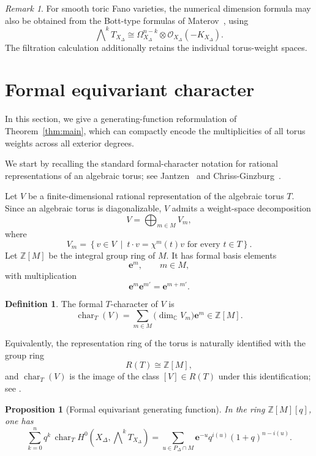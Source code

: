 \documentclass[colorlinks,11pt,reqno]{amsart}
\newtheorem{proposition}[theorem]{Proposition}
\theoremstyle{definition}
\newtheorem{definition}[theorem]{Definition}
\theoremstyle{remark}
\newtheorem{remark}[theorem]{Remark}
\numberwithin{equation}{section}
\numberwithin{equation}{section}
\newcommand{\C}{\mathbb{C}}
\newcommand{\Z}{\mathbb{Z}}
\DeclareMathOperator{\charac}{char}
\begin{document}
\begin{remark}
For smooth toric Fano varieties, the numerical dimension formula may also be obtained from the Bott-type formulas of Materov~\cite{Materov 02}, using
\[
\bigwedge\nolimits^kT_{X_\Delta} \cong
\Omega_{X_\Delta}^{n-k} \otimes \mathcal{O}_{X_\Delta}(-K_{X_\Delta}).
\]
The filtration calculation additionally retains the individual torus-weight spaces.
\end{remark}

\section{Formal equivariant character}\label{subsec:formal-character}
In this section, we give a generating-function reformulation of Theorem~\ref{thm:main}, which can compactly encode the multiplicities of all torus weights across all exterior degrees.

We start by recalling the standard formal-character notation for rational representations of an algebraic torus; see Jantzen~\cite{Jantzen} and Chriss-Ginzburg~\cite{ChrissGinzburg}.

Let \(V\) be a finite-dimensional rational representation of the algebraic torus \(T\).
Since an algebraic torus is diagonalizable, \(V\) admits a weight-space decomposition
\[
V=\bigoplus_{m\in M}V_m,
\]
where
\[
V_m =
\left\{
v\in V\ \middle|\
t\cdot v=\chi^m(t)v
\text{ for every }t\in T
\right\}.
\]
Let \(\Z[M]\) be the integral group ring of \(M\). It has formal basis elements
\[
\mathbf e^m,\qquad m\in M,
\]
with multiplication
\[
\mathbf e^m\mathbf e^{m'} = \mathbf e^{m+m'}.
\]

\begin{definition}\label{def:formal-character}
The formal \(T\)-character of \(V\) is
\[
\charac_T(V) = \sum_{m\in M} \bigl(\dim_{\C}V_m\bigr)\mathbf e^m \in \Z[M].
\]
\end{definition}

Equivalently, the representation ring of the torus is naturally identified with the group ring
\[
R(T) \cong \Z[M],
\]
and \(\charac_T(V)\) is the image of the class \([V]\in R(T)\) under this identification; see
\cites{ChrissGinzburg, Jantzen}.

\begin{proposition}[Formal equivariant generating function]\label{cor:character}
In the ring \(\Z[M][q]\), one has
\begin{equation}\label{eq:character}
\sum_{k=0}^{n}q^k\, \charac_T H^0\!\left( X_\Delta,\bigwedge\nolimits^kT_{X_\Delta} \right)
= \sum_{u\in P_\Delta\cap M} \mathbf e^{-u} q^{i(u)}(1+q)^{n-i(u)}.
\end{equation}
\end{proposition}
\end{document}
